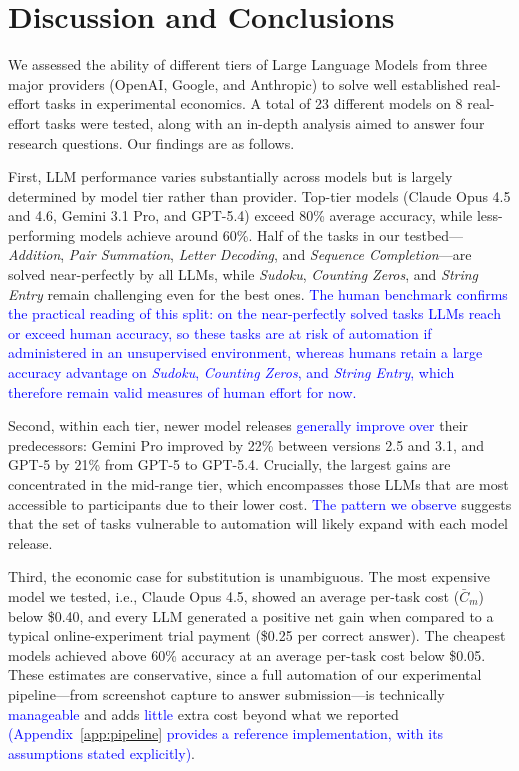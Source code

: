 \documentclass[12pt,a4paper]{article}
\newcommand{\blue}[1]{\textcolor{blue}{#1}}
\begin{document}
\section{Discussion and Conclusions}

We assessed the ability of different tiers of Large Language Models from  three major providers (OpenAI, Google, and Anthropic) to solve well established real-effort tasks in experimental economics. A total of 23 different models on 8 real-effort tasks were tested, along with an in-depth analysis aimed to answer four research questions. Our findings are as follows.

First, LLM performance varies substantially across models but is largely determined by model tier rather than provider. Top-tier models (Claude Opus 4.5 and 4.6, Gemini 3.1 Pro, and GPT-5.4) exceed 80\% average accuracy, while less-performing models achieve around 60\%. Half of the tasks in our testbed---\emph{Addition}, \emph{Pair Summation}, \emph{Letter Decoding}, and \emph{Sequence Completion}---are solved near-perfectly by all LLMs, while \emph{Sudoku}, \emph{Counting Zeros}, and \emph{String Entry} remain challenging even for the best ones. \blue{The human benchmark confirms the practical reading of this split: on the near-perfectly solved tasks LLMs reach or exceed human accuracy, so these tasks are at risk of automation if administered in an unsupervised environment, whereas humans retain a large accuracy advantage on \emph{Sudoku}, \emph{Counting Zeros}, and \emph{String Entry}, which therefore remain valid measures of human effort for now.}

Second, within each tier, newer model releases \blue{generally improve over} their predecessors: Gemini Pro improved by 22\% between versions 2.5 and 3.1, and GPT-5 by 21\% from GPT-5 to GPT-5.4. Crucially, the largest gains are concentrated in the mid-range tier, which encompasses those LLMs that are most accessible to participants due to their lower cost. \blue{The pattern we observe} suggests that the set of tasks vulnerable to automation will likely expand with each model release.

Third, the economic case for substitution is unambiguous. The most expensive model we tested, i.e., Claude Opus 4.5, showed an average per-task cost ($\bar{C}_m$)
below \$0.40, and every LLM generated a positive net gain when compared to a typical online-experiment trial payment (\$0.25 per correct answer). The cheapest models achieved above 60\% accuracy at an average per-task cost below \$0.05. These estimates are conservative, since a full automation of our experimental pipeline---from screenshot capture to answer submission---is technically \blue{manageable} and adds \blue{little} extra cost beyond what we reported \blue{(Appendix~\ref{app:pipeline} provides a reference implementation, with its assumptions stated explicitly)}.
\end{document}
